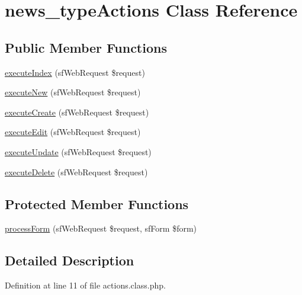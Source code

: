 \hypertarget{classnews__type_actions}{\section{news\-\_\-type\-Actions Class Reference}
\label{classnews__type_actions}
}
\subsection*{Public Member Functions}
\begin{DoxyCompactItemize}
\item 
\hyperlink{classnews__type_actions_a948cc911eb1d9f77990be54af3b2080f}{execute\-Index} (sf\-Web\-Request \$request)
\item 
\hyperlink{classnews__type_actions_a0ffbea56560c6c633dae68ec22aff21c}{execute\-New} (sf\-Web\-Request \$request)
\item 
\hyperlink{classnews__type_actions_a75837617743fb64dca82d8133b2c662a}{execute\-Create} (sf\-Web\-Request \$request)
\item 
\hyperlink{classnews__type_actions_af4d8fedd4b28f3398826a1bb8fa54394}{execute\-Edit} (sf\-Web\-Request \$request)
\item 
\hyperlink{classnews__type_actions_af7b4f51862add3c2ebb54efc136a0840}{execute\-Update} (sf\-Web\-Request \$request)
\item 
\hyperlink{classnews__type_actions_a52b5b11b11a0070dd2662257520c045a}{execute\-Delete} (sf\-Web\-Request \$request)
\end{DoxyCompactItemize}
\subsection*{Protected Member Functions}
\begin{DoxyCompactItemize}
\item 
\hyperlink{classnews__type_actions_a7cf661d837626e0320753cbffa019a01}{process\-Form} (sf\-Web\-Request \$request, sf\-Form \$form)
\end{DoxyCompactItemize}


\subsection{Detailed Description}


Definition at line 11 of file actions.\-class.\-php.



